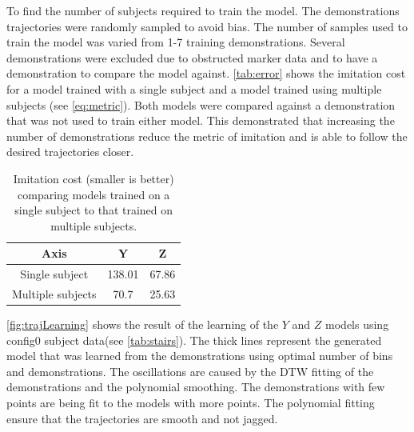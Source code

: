 To find the number of subjects required to train the model. The demonstrations trajectories were randomly sampled to avoid bias. The number of samples used to train the model was varied from 1-7 training demonstrations. Several demonstrations were excluded due to obstructed marker data and to have a demonstration to compare the model against. \autoref{tab:error} shows the imitation cost for a model trained with a single subject and a model trained using multiple subjects (see \autoref{eq:metric}). Both models were compared against a demonstration that was not used to train either model. This demonstrated that increasing the number of demonstrations reduce the metric of imitation and is able to follow the desired trajectories closer.   


\begin{table}[h]
\large 
     \centering 
     \begin{tabular}{||c|| c c ||}  
     \hline 
         Axis     & Y & Z  \\ [0.5ex]  
         \hline\hline 
         Single subject   & 138.01 & 67.86  \\  
         \hline 
         Multiple subjects & 70.7 & 25.63  \\ 
         \hline      
     \end{tabular} 
     \caption[Stair Imitation Cost]{Imitation cost (smaller is better) comparing models trained on a single subject to that trained on multiple subjects.  } 
     \label{tab:error} 
\end{table} 

\autoref{fig:trajLearning} shows the result of the learning of the $Y$ and $Z$ models using config0 subject data(see \autoref{tab:stairs}). The thick lines represent the generated model that was learned from the demonstrations using optimal number of bins and demonstrations.  The oscillations are caused by the DTW fitting of the demonstrations and the polynomial smoothing. The demonstrations with few points are being fit to the models with more points. The polynomial fitting ensure that the trajectories are smooth and not jagged.

